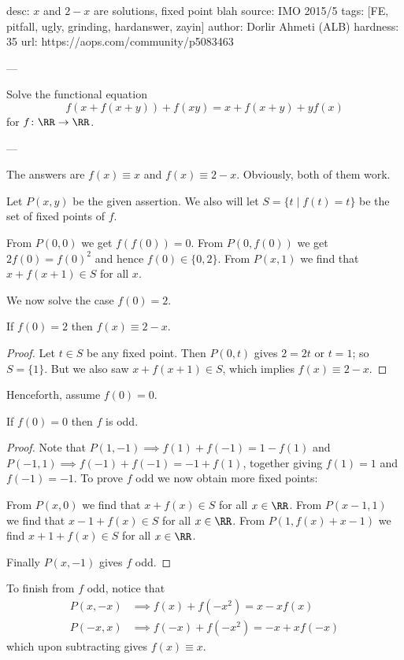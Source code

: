 desc:  $x$ and $2-x$ are solutions, fixed point blah
source:  IMO 2015/5
tags:  [FE, pitfall, ugly, grinding, hardanswer, zayin]
author: Dorlir Ahmeti (ALB)
hardness: 35
url: https://aops.com/community/p5083463

---

Solve the functional equation
\[ f(x+f(x+y)) + f(xy) = x + f(x+y) + yf(x) \]
for $f \colon \RR \to \RR$.

---

The answers are $f(x) \equiv x$ and $f(x) \equiv 2-x$.
Obviously, both of them work.

Let $P(x,y)$ be the given assertion.
We also will let $S = \{t \mid f(t) = t\}$
be the set of fixed points of $f$.
\begin{itemize}
  \ii From $P(0,0)$ we get $f(f(0)) = 0$.
  \ii From $P(0,f(0))$ we get $2f(0) = f(0)^2$
  and hence $f(0) \in \{0,2\}$.
  \ii From $P(x,1)$
  we find that $x+f(x+1) \in S$ for all $x$.
\end{itemize}

We now solve the case $f(0) = 2$.
\begin{claim*}
  If $f(0) = 2$ then $f(x) \equiv 2-x$.
\end{claim*}
\begin{proof}
  Let $t \in S$ be any fixed point.
  Then $P(0,t)$ gives $2 = 2t$ or $t = 1$;
  so $S = \{1\}$.
  But we also saw $x+f(x+1) \in S$,
  which implies $f(x) \equiv 2-x$.
\end{proof}

Henceforth, assume $f(0) = 0$.
\begin{claim*}
  If $f(0) = 0$ then $f$ is odd.
\end{claim*}
\begin{proof}
  Note that $P(1,-1) \implies f(1) + f(-1) = 1 - f(1)$
  and $P(-1,1) \implies f(-1) + f(-1) = -1 + f(1)$,
  together giving $f(1) = 1$ and $f(-1) = -1$.
  To prove $f$ odd we now obtain more fixed points:
  \begin{itemize}
    \ii From $P(x,0)$ we find that $x+f(x) \in S$ for all $x \in \RR$.
    \ii From $P(x-1,1)$ we find that $x-1+f(x) \in S$ for all $x \in \RR$.
    \ii From $P(1, f(x)+x-1)$ we find $x+1+f(x) \in S$ for all $x \in \RR$.
  \end{itemize}
  Finally $P(x, -1)$ gives $f$ odd.
\end{proof}
To finish from $f$ odd, notice that
\begin{align*}
  P(x,-x) &\implies f(x) + f(-x^2) = x - xf(x) \\
  P(-x,x) &\implies f(-x) + f(-x^2) = -x + xf(-x)
\end{align*}
which upon subtracting gives $f(x) \equiv x$.
